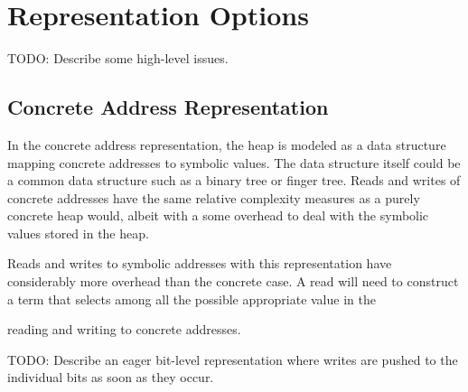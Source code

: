 \documentclass{article}
\begin{document}
\section{Representation Options}

TODO: Describe some high-level issues.


\subsection{Concrete Address Representation}

In the concrete address representation, the heap is modeled as a data structure
mapping concrete addresses to symbolic values.  The data structure itself could
be a common data structure such as a binary tree or finger tree.  Reads and writes
of concrete addresses have the same relative complexity measures as a purely
concrete heap would, albeit with a some overhead to deal with the symbolic values
stored in the heap.

Reads and writes to symbolic addresses with this representation have
considerably more overhead than the concrete case.  A read will need to
construct a term that selects among all the possible  appropriate value in the 

reading and writing to concrete addresses. 




TODO: Describe an eager bit-level representation where writes are
pushed to the individual bits as soon as they occur.
\end{document}
